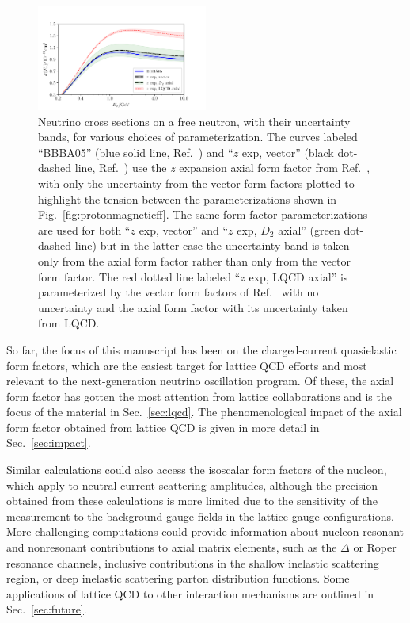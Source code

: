 \begin{figure}[hbt!]
 \centering
 \includegraphics[width=0.5\textwidth]{plots/xsec_comparison-standalone.pdf}
\caption{
 Neutrino cross sections on a free neutron, with their uncertainty bands,
 for various choices of parameterization.
 The curves labeled ``BBBA05'' (blue solid line, Ref.~\cite{Bradford:2006yz})
 and ``$z$ exp, vector'' (black dot-dashed line, Ref.~\cite{Borah:2020gte}) use the
 $z$ expansion axial form factor from Ref.~\cite{Meyer:2016oeg},
 with only the uncertainty from the vector form factors plotted
 to highlight the tension between the parameterizations shown in Fig.~\ref{fig:protonmagneticff}.
 The same form factor parameterizations are used for both ``$z$ exp, vector'' and
 ``$z$ exp, $D_{2}$ axial'' (green dot-dashed line)
 but in the latter case the uncertainty band is taken only from
 the axial form factor rather than only from the vector form factor.
 The red dotted line labeled ``$z$ exp, LQCD axial'' is parameterized by
 the vector form factors of Ref.~\cite{Borah:2020gte} with no uncertainty
 and the axial form factor with its uncertainty taken from LQCD.
 \label{fig:nucleonxsec}
}
\end{figure}

So far, the focus of this manuscript has been on the charged-current
 quasielastic form factors, which are the easiest target for lattice QCD
 efforts and most relevant to the next-generation neutrino oscillation program.
Of these, the axial form factor has gotten the most attention from lattice collaborations
 and is the focus of the material in Sec.~\ref{sec:lqcd}.
The phenomenological impact of the axial form factor obtained from lattice QCD
 is given in more detail in Sec.~\ref{sec:impact}.

Similar calculations could also access the isoscalar form factors of the nucleon,
 which apply to neutral current scattering amplitudes,
 although the precision obtained from these calculations is more limited
 due to the sensitivity of the measurement to the background gauge fields
 in the lattice gauge configurations.
More challenging computations could provide information about nucleon
 resonant and nonresonant contributions to axial matrix elements,
 such as the $\Delta$ or Roper resonance channels,
 inclusive contributions in the shallow inelastic scattering region,
 or deep inelastic scattering parton distribution functions.
Some applications of lattice QCD to other interaction mechanisms
 are outlined in Sec.~\ref{sec:future}.

